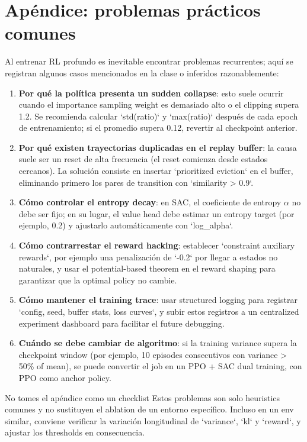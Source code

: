 \section{Apéndice: problemas prácticos comunes}

Al entrenar RL profundo es inevitable encontrar problemas recurrentes; aquí se registran algunos casos mencionados en la clase o inferidos razonablemente:

\begin{enumerate}
    \item \textbf{Por qué la política presenta un sudden collapse}: esto suele ocurrir cuando el importance sampling weight es demasiado alto o el clipping supera 1.2. Se recomienda calcular `std(ratio)` y `max(ratio)` después de cada epoch de entrenamiento; si el promedio supera 0.12, revertir al checkpoint anterior.
    \item \textbf{Por qué existen trayectorias duplicadas en el replay buffer}: la causa suele ser un reset de alta frecuencia (el reset comienza desde estados cercanos). La solución consiste en insertar `prioritized eviction` en el buffer, eliminando primero los pares de transition con `similarity > 0.9`.
    \item \textbf{Cómo controlar el entropy decay}: en SAC, el coeficiente de entropy $\alpha$ no debe ser fijo; en su lugar, el value head debe estimar un entropy target (por ejemplo, 0.2) y ajustarlo automáticamente con `log_alpha`.
    \item \textbf{Cómo contrarrestar el reward hacking}: establecer `constraint auxiliary rewards`, por ejemplo una penalización de `-0.2` por llegar a estados no naturales, y usar el potential-based theorem en el reward shaping para garantizar que la optimal policy no cambie.
    \item \textbf{Cómo mantener el training trace}: usar structured logging para registrar `config, seed, buffer stats, loss curves`, y subir estos registros a un centralized experiment dashboard para facilitar el future debugging.
    \item \textbf{Cuándo se debe cambiar de algoritmo}: si la training variance supera la checkpoint window (por ejemplo, 10 episodes consecutivos con variance > 50\% of mean), se puede convertir el job en un PPO + SAC dual training, con PPO como anchor policy.
\end{enumerate}

\begin{warningbox}{No tomes el apéndice como un checklist}
Estos problemas son solo heuristics comunes y no sustituyen el ablation de un entorno específico. Incluso en un env similar, conviene verificar la variación longitudinal de `variance`, `kl` y `reward`, y ajustar los thresholds en consecuencia.
\end{warningbox}


